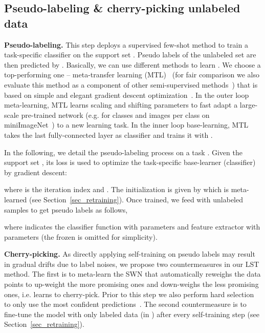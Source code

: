 \documentclass{article}
\newcommand{\myparagraph}[1]{\vspace{0.1em}\noindent\textbf{#1}}
\begin{document}
\subsection{Pseudo-labeling \& cherry-picking unlabeled data}
\label{sec_pseudolabeling}

\myparagraph{Pseudo-labeling.}
This step deploys a supervised few-shot method to train a task-specific classifier  on the support set . 
Pseudo labels of the unlabeled set  are then predicted by .
Basically, we can use different methods to learn .
We choose a top-performing one -- meta-transfer learning (MTL)~\cite{SunCVPR2019} (for fair comparison we also evaluate this method as a component of other semi-supervised methods~\cite{RenICLR2018_semisupervised, LiuICLR2019transductive})
that is based on simple and elegant gradient descent optimization~\cite{FinnAL17}.
In the outer loop meta-learning, MTL learns scaling and shifting parameters  to fast adapt a large-scale pre-trained network  (e.g. for  classes and  images per class on miniImageNet~\cite{VinyalsBLKW16}) to a new learning task.
In the inner loop base-learning, MTL takes the last fully-connected layer as classifier  and trains it with . 



In the following, we detail the pseudo-labeling process on a task . 
Given the support set ,
its loss is used to optimize the task-specific base-learner (classifier)  by gradient descent:

where  is the iteration index and . The initialization  is given by  which is meta-learned (see Section~\ref{sec_retraining}). 
Once trained, we feed  with unlabeled samples 
to get pseudo labels  as follows,

where  indicates the classifier function with parameters  and feature extractor with parameters  (the frozen  is omitted for simplicity).



\myparagraph{Cherry-picking.}
As directly applying self-training on pseudo labels  may result in gradual drifts due to label noises,
we propose two countermeasures in our LST method.
The first is to meta-learn the SWN that automatically reweighs the data points to up-weight the more promising ones and down-weighs the less promising ones, i.e. learns to cherry-pick.
Prior to this step we also perform hard selection to only use the most confident predictions~\cite{TrigueroGH15self_labeled}.
The second countermeasure is to fine-tune the model with only labeled data (in ) after every self-training step (see Section~\ref{sec_retraining}). 
\end{document}
